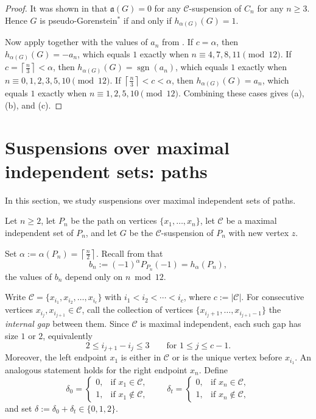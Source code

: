 \documentclass[12pt]{amsart}
\theoremstyle{plain}
\theoremstyle{definition}
\begin{document}
\begin{proof}
It was shown in \cite[Theorem 4.9]{Kara_Vien_2026} that \(\mathfrak a(G)=0\) for any $\mathcal{C}$-suspension of $C_n$ for any $n\geq 3$. Hence \(G\) is pseudo-Gorenstein\(^{*}\) if and
only if \(h_{\alpha(G)}(G)=1\).

Now apply  together with the values of \(a_n\) from
. If \(c=\alpha\), then
\(h_{\alpha(G)}(G)=-a_n\), which equals \(1\) exactly when
\(n\equiv 4,7,8,11\pmod{12}\). If \(c=\left\lceil \frac n3\right\rceil<\alpha\),
then \(h_{\alpha(G)}(G)=\operatorname{sgn}(a_n)\), which equals \(1\) exactly when
\(n\equiv 0,1,2,3,5,10\pmod{12}\). If
\(\left\lceil \frac n3\right\rceil<c<\alpha\), then \(h_{\alpha(G)}(G)=a_n\), which
equals \(1\) exactly when \(n\equiv 1,2,5,10\pmod{12}\). Combining these cases gives
(a), (b), and (c).
\end{proof}


\section{Suspensions over maximal independent sets: paths}

In this section, we study suspensions over maximal independent sets of paths.

Let \(n\ge 2\), let \(P_n\) be the path on vertices \(\{x_1,\ldots,x_n\}\), let
\(\mathcal C\) be a maximal independent set of \(P_n\), and let \(G\) be the
\(\mathcal C\)-suspension of \(P_n\) with new vertex \(z\).

Set \(\alpha:=\alpha(P_n)=\left\lceil \frac n2\right\rceil\). Recall from    that
\[
b_n:=(-1)^{\alpha}P_{P_n}(-1)=h_{\alpha}(P_n),
\]
the values of \(b_n\) depend only on
\(n\bmod 12\).

\begin{notation}\label{not:path_susp_max_ind}
Write \(\mathcal C=\{x_{i_1},x_{i_2},\dots,x_{i_c}\}\) with
\(i_1<i_2<\cdots<i_c\), where \(c:=|\mathcal C|\). For consecutive vertices
\(x_{i_j},x_{i_{j+1}}\in \mathcal C\), call the collection of vertices \(\{x_{i_j+1},\dots,x_{i_{j+1}-1}\}\) the \emph{internal gap} between them. Since \(\mathcal C\) is maximal
independent, each such gap has size \(1\) or \(2\), equivalently
\[
2\le i_{j+1}-i_j\le 3 \qquad \text{for }1\le j\le c-1.
\]
Moreover, the left endpoint \(x_1\) is either in \(\mathcal C\) or is the unique
vertex before \(x_{i_1}\). An analogous statement holds for the right endpoint \(x_n\). Define
\[
\delta_0=
\begin{cases}
0,& \text{if }x_1\in \mathcal C,\\
1,& \text{if }x_1\notin \mathcal C,
\end{cases}
\qquad
\delta_t=
\begin{cases}
0,& \text{if }x_n\in \mathcal C,\\
1,& \text{if }x_n\notin \mathcal C,
\end{cases}
\]
and set \(\delta:=\delta_0+\delta_t\in\{0,1,2\}\).
\end{notation}
\end{document}
